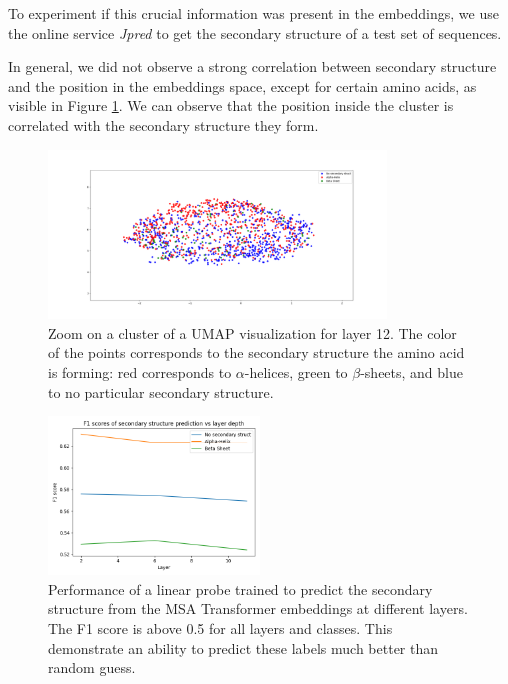 \documentclass[11pt,a4paper]{article}
\begin{document}
To experiment if this crucial information was present in the embeddings, we use the online service \emph{Jpred} \cite{cole2008jpred} to get the secondary structure of a test set of sequences.

In general, we did not observe a strong correlation between secondary structure and the position in the embeddings space, except for certain amino acids, as visible in Figure \ref{zoom_umap_sec_struct}. We can observe that the position inside the cluster is correlated with the secondary structure they form. 

\begin{figure}[ht]
\centering
\includegraphics[width=0.8\textwidth]{images/sec_struct_zoom.png}
\caption{Zoom on a cluster of a UMAP visualization for layer 12. The color of the points corresponds to the secondary structure the amino acid is forming: red corresponds to $\alpha$-helices, green to $\beta$-sheets, and blue to no particular secondary structure. }
\label{zoom_umap_sec_struct}
\end{figure}


\begin{figure}[ht]
\centering
\includegraphics[width=0.5\textwidth]{images/plots_sec_pred_logistic_regression.png}
\caption{Performance of a linear probe trained to predict the secondary structure from the MSA Transformer embeddings at different layers. The F1 score is above 0.5 for all layers and classes. This demonstrate an ability to predict these labels much better than random guess. }
\label{plot_f1_scores_linear_probe_sec_struct}
\end{figure}
\end{document}
